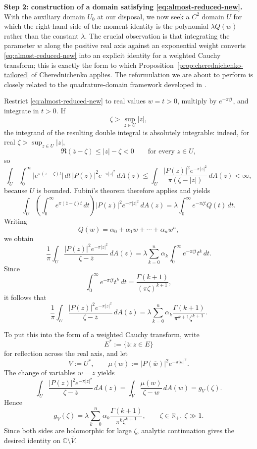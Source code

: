 \documentclass[a4paper,11pt,reqno]{amsart}
\numberwithin{equation}{section}
\theoremstyle{plain} %
\theoremstyle{definition} %
\theoremstyle{remark}
\newcommand{\R}{\mathbb{R}}
\newcommand{\C}{\mathbb{C}}
\begin{document}
\medskip
\noindent\textbf{Step 2: construction of a domain satisfying \eqref{eq:almost-reduced-new}.}
With the auxiliary domain $U_0$ at our disposal, we now seek a $C^2$ domain $U$ for which the right-hand side of the moment identity is the polynomial $\lambda Q(w)$ rather than the constant $\lambda$. The crucial observation is that integrating the parameter $w$ along the positive real axis against an exponential weight converts \eqref{eq:almost-reduced-new} into an explicit identity for a weighted Cauchy transform; this is exactly the form to which Proposition~\ref{prop:cherednichenko-tailored} of Cherednichenko \cite{Cherednichenko} applies. The reformulation we are about to perform is closely related to the quadrature-domain framework developed in \cite{Gustafsson,Gustafsson-Shahgholian,Karp,Shahgholian}.

Restrict \eqref{eq:almost-reduced-new} to real values $w=t>0$, multiply by $e^{-\pi \zeta t}$, and integrate in $t>0$. If
\[
\zeta>\sup_{z\in U}|z|,
\]
the integrand of the resulting double integral is absolutely integrable: indeed, for real $\zeta>\sup_{z\in U}|z|$,
\[
\Re(\overline z-\zeta)\le |z|-\zeta<0
\qquad \text{for every } z\in U,
\]
so
\[
\int_U \int_0^\infty \big|e^{\pi(\overline z-\zeta)t}\big|\,dt\,|P(z)|^2 e^{-\pi|z|^2}\,dA(z)
\le
\int_U \frac{|P(z)|^2 e^{-\pi|z|^2}}{\pi(\zeta-|z|)}\,dA(z)<\infty,
\]
because $U$ is bounded. Fubini's theorem therefore applies and yields
\[
\int_U \left(\int_0^\infty e^{\pi(\overline z-\zeta)t}\,dt\right)|P(z)|^2e^{-\pi|z|^2}\,dA(z)
=
\lambda\int_0^\infty e^{-\pi\zeta t}Q(t)\,dt.
\]
Writing
\[
Q(w)=\alpha_0+\alpha_1 w+\cdots+\alpha_n w^n,
\]
we obtain
\[
\frac{1}{\pi}\int_U \frac{|P(z)|^2e^{-\pi|z|^2}}{\zeta-\overline z}\,dA(z)
=
\lambda \sum_{k=0}^n \alpha_k \int_0^\infty e^{-\pi \zeta t} t^k\,dt.
\]
Since
\[
\int_0^\infty e^{-\pi \zeta t} t^k\,dt
=
\frac{\Gamma(k+1)}{(\pi \zeta)^{k+1}},
\]
it follows that
\[
\frac{1}{\pi}\int_U \frac{|P(z)|^2e^{-\pi|z|^2}}{\zeta-\overline z}\,dA(z)
=
\lambda \sum_{k=0}^n \alpha_k \frac{\Gamma(k+1)}{\pi^{k+1}\zeta^{k+1}}.
\]

To put this into the form of a weighted Cauchy transform, write
\[
E^\ast:=\{\overline z:z\in E\}
\]
for reflection across the real axis, and let
\[
V:=U^\ast,
\qquad
\mu(w):=|P(\overline w)|^2 e^{-\pi|w|^2}.
\]
The change of variables $w=\overline z$ yields
\[
\int_U \frac{|P(z)|^2e^{-\pi|z|^2}}{\zeta-\overline z}\,dA(z)
=
\int_V \frac{\mu(w)}{\zeta-w}\,dA(w)
=
g_V(\zeta).
\]
Hence
\begin{equation}\label{eq:analytic-construct-new}
g_V(\zeta)
=
\lambda \sum_{k=0}^n \alpha_k \frac{\Gamma(k+1)}{\pi^k \zeta^{k+1}},
\qquad \zeta\in \R_+, \ \zeta\gg 1.
\end{equation}
Since both sides are holomorphic for large $\zeta$, analytic continuation gives the desired identity on $\C\setminus\overline V$.
\end{document}
